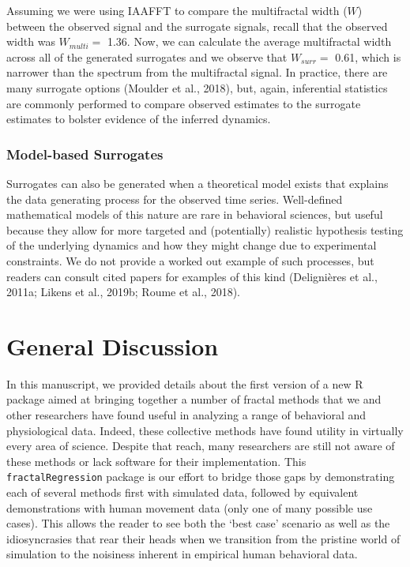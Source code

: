 \documentclass[
  man]{apa6}
\begin{document}
Assuming we were using IAAFFT to compare the multifractal width (\(W\))
between the observed signal and the surrogate signals, recall that the
observed width was \(W_{multi} =\)
1.36. Now, we can
calculate the average multifractal width across all of the generated
surrogates and we observe that \(W_{surr} =\) 0.61, which is
narrower than the spectrum from the multifractal signal. In practice,
there are many surrogate options (Moulder et al., 2018), but, again, inferential
statistics are commonly performed to compare observed estimates to the
surrogate estimates to bolster evidence of the inferred dynamics.

\hypertarget{model-based-surrogates}{%
\subsubsection{Model-based Surrogates}\label{model-based-surrogates}}

Surrogates can also be generated when a theoretical model exists that
explains the data generating process for the observed time series.
Well-defined mathematical models of this nature are rare in behavioral
sciences, but useful because they allow for more targeted and
(potentially) realistic hypothesis testing of the underlying dynamics
and how they might change due to experimental constraints. We do not
provide a worked out example of such processes, but readers can consult
cited papers for examples of this kind (Delignières et al., 2011a; Likens et al., 2019b; Roume et al., 2018).

\hypertarget{general-discussion}{%
\section{General Discussion}\label{general-discussion}}

In this manuscript, we provided details about the first version of a new
R package aimed at bringing together a number of fractal methods that we
and other researchers have found useful in analyzing a range of
behavioral and physiological data. Indeed, these collective methods have
found utility in virtually every area of science. Despite that reach,
many researchers are still not aware of these methods or lack software
for their implementation. This \texttt{fractalRegression} package is our effort
to bridge those gaps by demonstrating each of several methods first with
simulated data, followed by equivalent demonstrations with human
movement data (only one of many possible use cases). This allows the
reader to see both the `best case' scenario as well as the
idiosyncrasies that rear their heads when we transition from the
pristine world of simulation to the noisiness inherent in empirical
human behavioral data.
\end{document}
